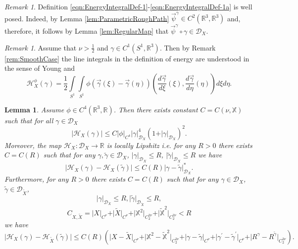 \documentclass[11pt,a4paper,leqno]{amsart}%
\theoremstyle{plain}
\theoremstyle{remark}
\newtheorem{remark}[theorem]{Remark}
\theoremstyle{plain}
\newtheorem{lemma}[theorem]{Lemma}
\numberwithin{equation}{section}
\def\Rnu{{\mathbb R}}
\def\intl{\int\limits}
\begin{document}
\begin{remark}\label{rem:CorrectEnergyDef}
Definition
\eqref{eqn:EnergyIntegralDef-1}-\eqref{eqn:EnergyIntegralDef-1a}
is well posed. Indeed, by Lemma \ref{lem:ParametricRoughPath}
$\vec{\psi}^{\gamma}\in C^2(\Rnu^3,\Rnu^3)$ and, therefore, it
follows by Lemma \ref{lem:RegularMap} that
$\vec{\psi}^{\gamma} \circ\gamma\in \mathcal{D}_X$.
\end{remark}
\begin{remark}
Assume that $\nu>\frac{1}{2}$ and $\gamma\in C^1(S^1,\Rnu^3)$.
Then by Remark \ref{rem:SmoothCase} the line integrals in the
definition of energy are understood in the sense of Young and
\begin{equation}
\mathcal{H}^\phi_X(\gamma)=\frac{1}{2}\intl_{S^1}\intl_{S^1}\phi(\vec{\gamma}(\xi)-\vec{\gamma}(\eta))
(\frac{d\vec{\gamma}}{d\xi}(\xi),\frac{d\vec{\gamma}}{d\eta}(\eta))d\xi
d\eta. \label{eqn:EnergyIntegralDef-2}
\end{equation}
\end{remark}
\begin{lemma}\label{lem:EnergyProperties}
Assume $\phi\in C^4(\Rnu^3,\Rnu)$. Then there exists constant
$C=C(\nu,\mathbb{X})$ such that for all $\gamma\in \mathcal{D}_X$
\begin{equation}
\vert \mathcal{H}_X(\gamma)\vert \leq
C\vert \phi\vert_{C^4}\vert \gamma\vert_{\mathcal{D}_X}^4(1+\vert \gamma\vert_{\mathcal{D}_X})^2.\label{eqn:EnergyEstimAbove}
\end{equation}
Moreover, the map $\mathcal{H}_X:\mathcal{D}_X\to\Rnu$ is locally
Lipshitz i.e. for any $R>0$ there exists $C=C(R)$ such that for
any $\gamma,\tilde{\gamma}\in\mathcal{D}_X$,
$\vert \gamma\vert_{\mathcal{D}_X}\leq R$, $\vert \tilde{\gamma}\vert_{\mathcal{D}_X}\leq R$
we have
\begin{equation}
\vert \mathcal{H}_X(\gamma)-\mathcal{H}_X(\tilde{\gamma})\vert \leq
C(R)\vert \gamma-\tilde{\gamma}\vert_{\mathcal{D}_X}^*.\label{eqn:LocLipshitz}
\end{equation}
Furthermore, for any $R>0$ there exists $C=C(R)$ such that for any
$\gamma\in\mathcal{D}_X$,
$\tilde{\gamma}\in\mathcal{D}_{\tilde{X}}$,
$$
\vert \gamma\vert_{\mathcal{D}_X}\leq R,
\vert \tilde{\gamma}\vert_{\mathcal{D}_{\tilde{X}}}\leq R,
$$
$$
C_{X,\tilde{X}}=\vert X\vert_{C^{\nu}}+\vert \tilde{X}\vert_{C^{\nu}}+\vert \mathbb{X}^2\vert_{C_2^{2\nu}}+\vert \mathbb{\tilde{X}}^2\vert_{C_2^{2\nu}}<R
$$
we have
\begin{equation}
\vert \mathcal{H}_X(\gamma)-\mathcal{H}_{\tilde{X}}(\tilde{\gamma})\vert \leq
C(R)(\vert X-\tilde{X}\vert_{C^{\nu}}+\vert \mathbb{X}^2-\mathbb{\tilde{X}}^2\vert_{C_2^{2\nu}}+\vert \gamma-\tilde{\gamma}\vert_{C^{\nu}}+\vert \gamma^\prime-\tilde{\gamma}^\prime\vert_{C^{\nu}}+\vert R^{\gamma}-R^{\tilde{\gamma}}\vert_{C_2^{2\nu}}).\label{eqn:LocLipshitz-2}
\end{equation}
\end{lemma}
\end{document}
